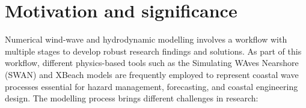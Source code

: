 \documentclass[preprint,12pt, a4paper]{elsarticle}
\begin{document}
\section{Motivation and significance}


Numerical wind-wave and hydrodynamic modelling involves a workflow with multiple stages to develop robust research findings and solutions. As part of this workflow, different physics-based tools such as the Simulating WAves Nearshore (SWAN) \cite{Booij_etal_1999} and XBeach \cite{Roelvink_etal_2009} models are frequently employed to represent coastal wave processes essential for hazard management, forecasting, and coastal engineering design. The modelling process brings different challenges in research:
\end{document}
